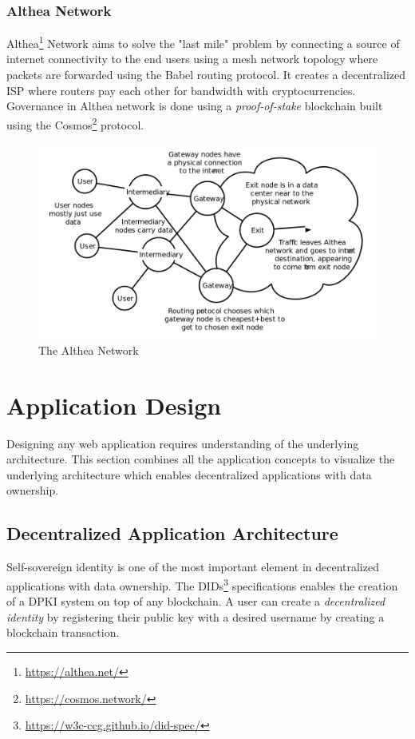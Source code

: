 		\subsubsection{Althea Network}
		Althea\footnote{\url{https://althea.net/}} Network aims to solve the "last mile" problem by connecting a source of internet connectivity to the end users using a mesh network topology where packets are forwarded using the Babel routing protocol\cite{chroboczek2011babel}. It creates a decentralized ISP where routers pay each other for bandwidth with cryptocurrencies. Governance in Althea network is done using a \textit{proof-of-stake} blockchain built using the Cosmos\footnote{\url{https://cosmos.network/}} protocol.
		
		\begin{figure}[h]
			\includegraphics[width=\linewidth]{figures/althea-network}
			\caption{\label{fig:althea-network} The Althea Network\protect\footnotemark}
		\end{figure}
	
\section{Application Design}
	Designing any web application requires understanding of the underlying architecture. This section combines all the application concepts to visualize the underlying architecture which enables decentralized applications with data ownership.
	
	\subsection{Decentralized Application Architecture}
	Self-sovereign identity is one of the most important element in decentralized applications with data ownership.  The DIDs\footnote{\url{https://w3c-ccg.github.io/did-spec/}} specifications enables the creation of a DPKI system on top of any blockchain. A user can create a \textit{decentralized identity} by registering their public key with a desired username by creating a blockchain transaction.
	
